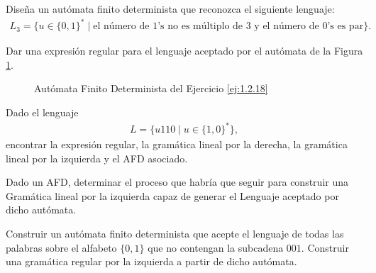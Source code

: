 \begin{ejercicio}
    Diseña un autómata finito determinista que reconozca el siguiente lenguaje:
    \begin{align*}
        L_3 = \{u \in \{0, 1\}^* \mid \text{el número de $1$'s no es múltiplo de } 3 \text{ y el número de $0$'s es par}\}.
    \end{align*}
\end{ejercicio}

\begin{ejercicio} \label{ej:1.2.18}
    Dar una expresión regular para el lenguaje aceptado por el autómata de la Figura \ref{fig:ej:1.2.18}.
    \begin{figure}
        \centering
        \caption{Autómata Finito Determinista del Ejercicio \ref{ej:1.2.18}}
        \label{fig:ej:1.2.18}
    \end{figure}
\end{ejercicio}


\begin{ejercicio} \label{ej:1.2.19}
    Dado el lenguaje
    \begin{align*}
        L = \{u110 \mid u \in \{1, 0\}^*\},
    \end{align*}
    encontrar la expresión regular, la gramática lineal por la derecha, la gramática lineal por la izquierda y el AFD asociado.
\end{ejercicio}

\begin{ejercicio}
    Dado un AFD, determinar el proceso que habría que seguir para construir una Gramática lineal por la izquierda capaz de generar el Lenguaje aceptado por dicho autómata.
\end{ejercicio}

\begin{ejercicio}
    Construir un autómata finito determinista que acepte el lenguaje de todas las palabras sobre el alfabeto $\{0, 1\}$ que no contengan la subcadena $001$.
    Construir una gramática regular por la izquierda a partir de dicho autómata.
\end{ejercicio}

